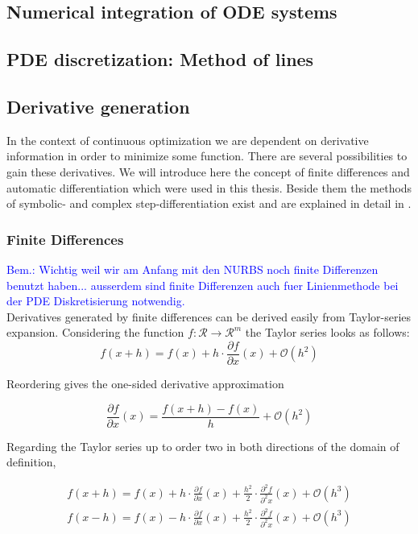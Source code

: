 \documentclass{scrartcl}[12pt, halfparskip]
\newcommand{\bem}[1]{\textcolor{blue}{Bem.: #1}}
\begin{document}
\subsection{Numerical integration of ODE systems}
\subsection{PDE discretization: Method of lines}

\subsection{Derivative generation}
In the context of continuous optimization we are dependent on derivative information in order to minimize some function. There are several possibilities to gain these derivatives. We will introduce here the concept of finite differences and automatic differentiation which were used in this thesis. Beside them the methods of symbolic- and complex step-differentiation exist and are explained in detail in \cite{diss_jan}.
\subsubsection{Finite Differences}
\bem{Wichtig weil wir am Anfang mit den NURBS noch finite Differenzen benutzt haben... ausserdem sind finite Differenzen auch fuer Linienmethode bei der PDE Diskretisierung notwendig.}\\

Derivatives generated by finite differences can be derived easily from Taylor-series expansion. Considering the function $f: \mathcal{R} \rightarrow \mathcal{R}^m$ the Taylor series looks as follows:
\begin{equation}
	f(x+h) = f(x) + h \cdot \frac{\partial f}{\partial x}(x) + \mathcal{O}(h^2)
\end{equation}

Reordering gives the one-sided derivative approximation

\begin{equation}
	\frac{\partial f}{\partial x}(x) = \frac{f(x+h) - f(x)}{h} + \mathcal{O}(h^2)
\end{equation}

Regarding the Taylor series up to order two in both directions of the domain of definition,

\begin{subequations}
\label{eq:finite_differences_taylor_exp}
\begin{align}
	f(x+h) = f(x) + h \cdot \frac{\partial f}{\partial x}(x) + \frac{h^2}{2} \cdot \frac{\partial^2 f}{\partial^2 x}(x) + \mathcal{O}(h^3) \label{eq:finite_differences_taylor_exp_+} \\
	f(x-h) = f(x) - h \cdot \frac{\partial f}{\partial x}(x) + \frac{h^2}{2} \cdot \frac{\partial^2 f}{\partial^2 x}(x) + \mathcal{O}(h^3)  \label{eq:finite_differences_taylor_exp_-}	
\end{align}
\end{subequations}
\end{document}
